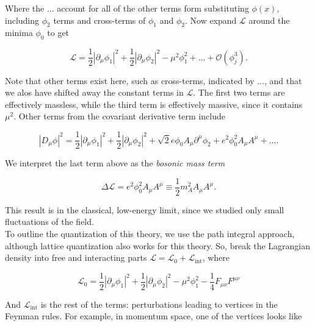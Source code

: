 \noindent Where the $\dots$ account for all of the other terms form substituting $\phi(x)$, including $\phi_2$ terms and cross-terms of $\phi_1$ and $\phi_2$. Now expand $\mathcal{L}$ around the minima $\phi_0$ to get

\begin{equation}
\mathcal{L} = \frac{1}{2} |\partial_\mu \phi_1|^2 + \frac{1}{2} |\partial_\mu \phi_2|^2 - \mu^2 \phi_1^2 + \dots + \mathcal{O}(\phi_j^3).
\end{equation}

\noindent Note that other terms exist here, such as cross-terms, indicated by $\dots$, and that we alos have shifted away the constant terms in $\mathcal{L}$. The first two terms are effectively massless, while the third term is effectively massive, since it contains $\mu^2$. Other terms from the covariant derivative term include

\begin{equation}
|D_\mu \phi|^2 =  \frac{1}{2} |\partial_\mu \phi_1|^2 + \frac{1}{2} |\partial_\mu \phi_2|^2 + \sqrt{2} e \phi_0 A_\mu \partial^\mu \phi_2 + e^2 \phi_0^2 A_\mu A^\mu + \dots.
\end{equation}

\noindent We interpret the last term above as the \textit{bosonic mass term}

\begin{equation}
\Delta{\mathcal{L}} = e^2 \phi_0^2 A_\mu A^\mu \equiv \frac{1}{2} m_A^2 A_\mu A^\mu.
\end{equation}

\noindent This result is in the classical, low-energy limit, since we studied only small fluctuations of the field. \\

\noindent To outline the quantization of this theory, we use the path integral approach, although lattice quantization also works for this theory. So, break the Lagrangian density into free and interacting parts $\mathcal{L} = \mathcal{L}_0 + \mathcal{L}_{\text{int}}$, where

\begin{equation}
\mathcal{L}_0 = \frac{1}{2} |\partial_\mu \phi_1|^2 + \frac{1}{2} |\partial_\mu \phi_2|^2 - \mu^2 \phi_1^2 - \frac{1}{4} F_{\mu\nu} F^{\mu\nu}
\end{equation}

\noindent And $\mathcal{L}_{\text{int}}$ is the rest of the terms: perturbations leading to vertices in the Feynman rules. For example, in momentum space, one of the vertices looks like


